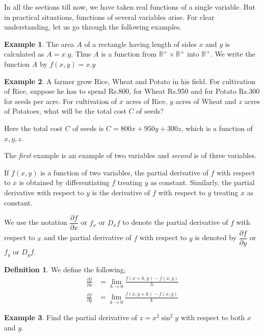 \documentclass[../../main.tex]{subfiles}
\theoremstyle{definition}
\newtheorem{definition}{Definition}[section]
\newtheorem{example}{Example}[section]
\begin{document}
In all the sections till now, we have taken real functions of a single variable. But in practical situations, functions of several variables arise. For clear understanding, let us go through the following examples.

\begin{example}
The area $A$ of a rectangle having length of sides $x$ and $y$ is calculated as $A=x.y$. Thus $A$ is a function from $\mathbb {R^+}\times \mathbb {R^+}$ into $\mathbb {R^+}$. We write the function $A$ by $f(x,y)=x.y$    
\end{example}

\begin{example}
A farmer grow Rice, Wheat and Potato in his field. For cultivation of Rice, suppose he has to spend Rs.800, for Wheat Rs.950 and for Potato Rs.300 for seeds per acre. For cultivation of $x$ acres of Rice, $y$ acres of Wheat and $z$ acres of Potatoes, what will be the total cost $C$ of seeds?

Here the total cost $C$ of seeds is $C=800x+950y+300z$, which is a function of $x,y,z$.    
\end{example}

The \emph{first} example is an example of two variables and \emph{second} is of three variables.

If $f(x,y)$ is a function of two variables, the partial derivative of $f$ with respect to $x$ is obtained by differentiating $f$ treating $y$ as constant. Similarly, the partial derivative with respect to $y$ is the derivative of $f$ with respect to $y$ treating $x$ as constant.

We use the notation $\dfrac{\partial f}{\partial x}$ or $f_x$ or $D_xf$ to denote the partial derivative of $f$ with respect to $x$ and the partial derivative of $f$ with respect to $y$ is denoted by $\dfrac{\partial f}{\partial y}$ or $f_y$ or $D_yf$.

\begin{definition}
We define the following,
\begin{align*}
    \frac{\partial f}{\partial x} &= \lim_{h\rightarrow 0}\frac{f(x+h,y)-f(x,y)}{h} \\
    \frac{\partial f}{\partial y} &= \lim_{k\rightarrow 0}\frac{f(x,y+k)-f(x,y)}{k}
\end{align*}
\end{definition}

\begin{example}
Find the partial derivative of $z=x^2\sin^2 y$ with respect to both $x$ and $y$.    
\end{example}
\end{document}
